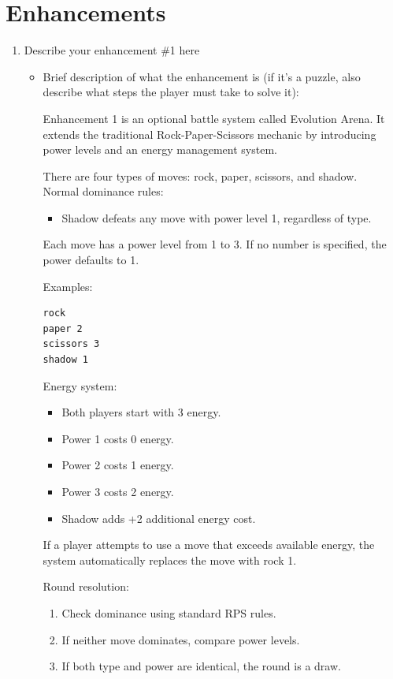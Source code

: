 \documentclass[11pt]{article}
\begin{document}
\section*{Enhancements}
\begin{enumerate}
    \item Describe your enhancement \#1 here
    \begin{itemize}
        \item Brief description of what the enhancement is (if it's a puzzle, also describe what steps the player must take to solve it):
        
        Enhancement 1 is an optional battle system called Evolution Arena. It extends the traditional Rock-Paper-Scissors mechanic by introducing power levels and an energy management system.
        
        There are four types of moves: rock, paper, scissors, and shadow.\\
        
        Normal dominance rules:
        \begin{itemize}
            \item Shadow defeats any move with power level 1, regardless of type.
        \end{itemize}

        Each move has a power level from 1 to 3. If no number is specified, the power defaults to 1.
        
        Examples:
        \begin{verbatim}
rock
paper 2
scissors 3
shadow 1
        \end{verbatim}

        Energy system:
\begin{itemize}
\item Both players start with 3 energy.
\item Power 1 costs 0 energy.
\item Power 2 costs 1 energy.
\item Power 3 costs 2 energy.
\item Shadow adds +2 additional energy cost.
\end{itemize}


If a player attempts to use a move that exceeds available energy, the system automatically replaces the move with rock 1.

\bigskip
Round resolution:
\begin{enumerate}
\item Check dominance using standard RPS rules.
\item If neither move dominates, compare power levels.
\item If both type and power are identical, the round is a draw.
\end{enumerate}


\end{itemize}
\end{enumerate}
\end{document}
